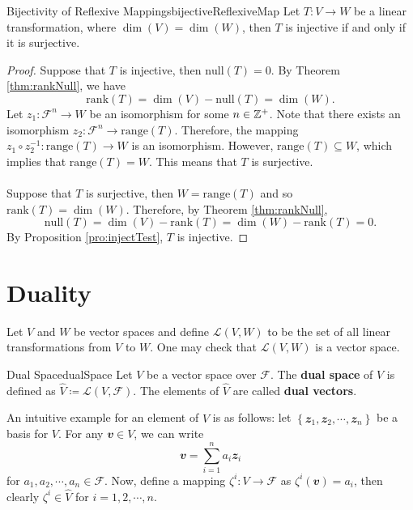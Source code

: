 \documentclass[math, code]{amznotes}
\theoremstyle{remark}
\begin{document}
\begin{corbox}{Bijectivity of Reflexive Mappings}{bijectiveReflexiveMap}
    Let $T \colon V \to W$ be a linear transformation, where $\dim(V) = \dim(W)$, then $T$ is injective if and only if it is surjective.
    \tcblower
    \begin{proof}
        Suppose that $T$ is injective, then $\mathrm{null}(T) = 0$. By Theorem \ref{thm:rankNull}, we have 
        \begin{equation*}
            \mathrm{rank}(T) = \dim(V) - \mathrm{null}(T) = \dim(W).
        \end{equation*} 
        Let $z_1 \colon \mathcal{F}^n \to W$ be an isomorphism for some $n \in \mathbb{Z}^+$. Note that there exists an isomorphism $z_2 \colon \mathcal{F}^n \to \mathrm{range}(T)$. Therefore, the mapping $z_1 \circ z_2^{-1} \colon \mathrm{range}(T) \to W$ is an isomorphism. However, $\mathrm{range}(T) \subseteq W$, which implies that $\mathrm{range}(T) = W$. This means that $T$ is surjective.
        \\\\
        Suppose that $T$ is surjective, then $W = \mathrm{range}(T)$ and so $\mathrm{rank}(T) = \dim(W)$. Therefore, by Theorem \ref{thm:rankNull}, 
        \begin{equation*}
            \mathrm{null}(T) = \dim(V) - \mathrm{rank}(T) = \dim(W) - \mathrm{rank}(T) = 0.
        \end{equation*}
        By Proposition \ref{pro:injectTest}, $T$ is injective.
    \end{proof}
\end{corbox}
\section{Duality}
Let $V$ and $W$ be vector spaces and define $\mathcal{L}(V, W)$ to be the set of all linear transformations from $V$ to $W$. One may check that $\mathcal{L}(V, W)$ is a vector space.
\begin{dfnbox}{Dual Space}{dualSpace}
    Let $V$ be a vector space over $\mathcal{F}$. The {\color{red} \textbf{dual space}} of $V$ is defined as $\hat{V} \coloneqq \mathcal{L}(V, \mathcal{F})$. The elements of $\hat{V}$ are called {\color{red} \textbf{dual vectors}}.
\end{dfnbox}
An intuitive example for an element of $\hat{V}$ is as follows: let $\left\{\mathbfit{z}_1, \mathbfit{z}_2, \cdots, \mathbfit{z}_n\right\}$ be a basis for $V$. For any $\mathbfit{v} \in V$, we can write
\begin{equation*}
    \mathbfit{v} = \sum_{i = 1}^{n}a_i\mathbfit{z}_i
\end{equation*}
for $a_1, a_2, \cdots, a_n \in \mathcal{F}$. Now, define a mapping $\zeta^i \colon V \to \mathcal{F}$ as $\zeta^i(\mathbfit{v}) = a_i$, then clearly $\zeta^i \in \hat{V}$ for $i = 1, 2, \cdots, n$.
\end{document}
